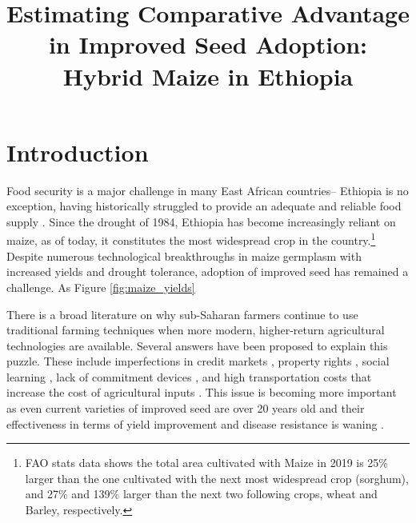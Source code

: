 \documentclass{article}
\title{Estimating Comparative Advantage in Improved Seed Adoption: Hybrid Maize in Ethiopia}
\begin{document}
\maketitle

\section{Introduction}

Food security is a major challenge in many East African countries-- Ethiopia is no exception, having historically struggled to provide an adequate and reliable food supply \citep{Ramakrishna2002-hv, Jaleta2018-oj}. Since the drought of 1984, Ethiopia has become increasingly reliant on maize, as of today, it constitutes the most widespread crop in the country.\footnote{FAO stats data shows the total area cultivated with Maize in 2019 is 25\% larger than the one cultivated with the next most widespread crop (sorghum), and 27\% and 139\% larger than the next two following crops, wheat and Barley, respectively.} Despite numerous technological breakthroughs in maize germplasm with increased yields and drought tolerance, adoption of improved seed has remained a challenge. As Figure \ref{fig:maize_yields} 



There is a broad literature on why sub-Saharan farmers continue to use traditional farming techniques when more modern, higher-return agricultural technologies are available. Several answers have been proposed to explain this puzzle. These include imperfections in credit markets \citep{Croppenstedt2003-pq}, property rights \citep{Place2000-el}, social learning \citep{Conley2010-ue,Foster1995-bz,Munshi2004-og}, lack of commitment devices \cite{Duflo2009-iv}, and high transportation costs that increase the cost of agricultural inputs \citep{Byerlee2013-qk}. This issue is becoming more important as even current varieties of improved seed are over 20 years old and their effectiveness in terms of yield improvement and disease resistance is waning \citep{Abate2015-rj}. 
\end{document}
